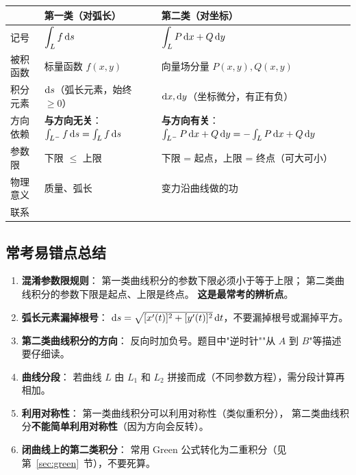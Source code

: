 \documentclass{article}
\begin{document}
\begin{center}
  \renewcommand{\arraystretch}{1.6}
  \begin{tabular}{>{\raggedright\arraybackslash}p{3cm}
      >{\raggedright\arraybackslash}p{5cm}
    >{\raggedright\arraybackslash}p{5cm}}
    \toprule
    & \textbf{第一类（对弧长）} & \textbf{第二类（对坐标）} \\
    \midrule
    记号
    & $\displaystyle\int_L f \,\mathrm{d} s$
    & $\displaystyle\int_L P\,\mathrm{d} x + Q\,\mathrm{d} y$ \\
    被积函数
    & 标量函数 $f(x,y)$
    & 向量场分量 $P(x,y), Q(x,y)$ \\
    积分元素
    & $\mathrm{d} s$（弧长元素，始终 $\ge 0$）
    & $\mathrm{d} x, \mathrm{d} y$（坐标微分，有正有负） \\
    方向依赖
    & \textbf{与方向无关}：$\int_{L^-} f \,\mathrm{d} s = \int_L f \,\mathrm{d} s$
    & \textbf{与方向有关}：$\int_{L^-} P\,\mathrm{d} x + Q\,\mathrm{d} y = -\int_L
    P\,\mathrm{d} x + Q\,\mathrm{d} y$ \\
    参数限
    & 下限 $\le$ 上限
    & 下限 = 起点，上限 = 终点（可大可小） \\
    物理意义
    & 质量、弧长
    & 变力沿曲线做的功 \\
    联系
    & \multicolumn{2}{c}{$\displaystyle\int_L P\,\dif x + Q\,\dif y =
    \int_L (P\cos\alpha + Q\cos\beta) \,\dif s$} \\
    \bottomrule
  \end{tabular}
\end{center}

\subsection{常考易错点总结}

\begin{enumerate}
  \item \textbf{混淆参数限规则}：
    第一类曲线积分的参数下限必须小于等于上限；
    第二类曲线积分的参数下限是起点、上限是终点。
    \textbf{这是最常考的辨析点}。
  \item \textbf{弧长元素漏掉根号}：
    $\mathrm{d} s = \sqrt{[x'(t)]^2+[y'(t)]^2}\,\mathrm{d} t$，不要漏掉根号或漏掉平方。
  \item \textbf{第二类曲线积分的方向}：
    反向时加负号。题目中"逆时针""从 $A$ 到 $B$"等描述要仔细读。
  \item \textbf{曲线分段}：
    若曲线 $L$ 由 $L_1$ 和 $L_2$ 拼接而成（不同参数方程），需分段计算再相加。
  \item \textbf{利用对称性}：
    第一类曲线积分可以利用对称性（类似重积分），
    第二类曲线积分\textbf{不能简单利用对称性}（因为方向会反转）。
  \item \textbf{闭曲线上的第二类积分}：
    常用 Green 公式转化为二重积分（见第~\ref{sec:green}~节），不要死算。
\end{enumerate}
\end{document}
